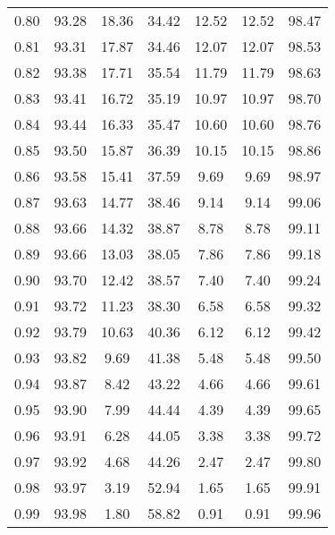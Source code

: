 \begin{tabular}{|c|c|c|c|c|c|c|}
      0.80 &     93.28 &     18.36 &      34.42 &   12.52 &      12.52 &         98.47 \\
      0.81 &     93.31 &     17.87 &      34.46 &   12.07 &      12.07 &         98.53 \\
      0.82 &     93.38 &     17.71 &      35.54 &   11.79 &      11.79 &         98.63 \\
      0.83 &     93.41 &     16.72 &      35.19 &   10.97 &      10.97 &         98.70 \\
      0.84 &     93.44 &     16.33 &      35.47 &   10.60 &      10.60 &         98.76 \\
      0.85 &     93.50 &     15.87 &      36.39 &   10.15 &      10.15 &         98.86 \\
      0.86 &     93.58 &     15.41 &      37.59 &    9.69 &       9.69 &         98.97 \\
      0.87 &     93.63 &     14.77 &      38.46 &    9.14 &       9.14 &         99.06 \\
      0.88 &     93.66 &     14.32 &      38.87 &    8.78 &       8.78 &         99.11 \\
      0.89 &     93.66 &     13.03 &      38.05 &    7.86 &       7.86 &         99.18 \\
      0.90 &     93.70 &     12.42 &      38.57 &    7.40 &       7.40 &         99.24 \\
      0.91 &     93.72 &     11.23 &      38.30 &    6.58 &       6.58 &         99.32 \\
      0.92 &     93.79 &     10.63 &      40.36 &    6.12 &       6.12 &         99.42 \\
      0.93 &     93.82 &      9.69 &      41.38 &    5.48 &       5.48 &         99.50 \\
      0.94 &     93.87 &      8.42 &      43.22 &    4.66 &       4.66 &         99.61 \\
      0.95 &     93.90 &      7.99 &      44.44 &    4.39 &       4.39 &         99.65 \\
      0.96 &     93.91 &      6.28 &      44.05 &    3.38 &       3.38 &         99.72 \\
      0.97 &     93.92 &      4.68 &      44.26 &    2.47 &       2.47 &         99.80 \\
      0.98 &     93.97 &      3.19 &      52.94 &    1.65 &       1.65 &         99.91 \\
      0.99 &     93.98 &      1.80 &      58.82 &    0.91 &       0.91 &         99.96 \\
\bottomrule
\end{tabular}
